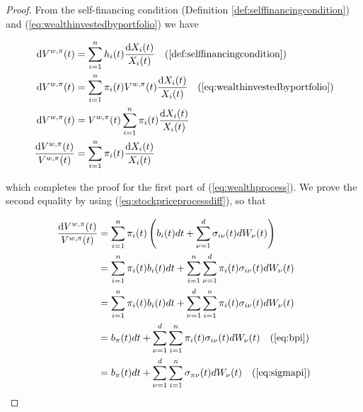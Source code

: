 \documentclass[british]{amsart}
\numberwithin{equation}{section}
\numberwithin{figure}{section}
\theoremstyle{plain}
\theoremstyle{definition}
\theoremstyle{plain}
\theoremstyle{plain}
\theoremstyle{plain}
\theoremstyle{remark}
\theoremstyle{plain}
\renewcommand{\d}[1]{\mathop{\mathrm{d}{#1}}}
\begin{document}
\begin{proof}

	From the self-financing condition (Definition \ref{def:selffinancingcondition}) 
  and (\ref{eq:wealthinvestedbyportfolio}) we have

	\begin{gather*}
		\begin{split}
	\d{V^{w,\pi}(t)} &= \sum_{i=1}^{n} h_{i}(t) \frac{\d{X_{i}(t)}}{X_{i}(t)}
			\quad (\ref{def:selffinancingcondition}) \\
 	\d{V^{w,\pi}(t)} &= \sum_{i=1}^{n} \pi_{i}(t)V^{w,\pi}(t) \frac{\d{X_{i}(t)}}{X_{i}(t)}
			\quad (\ref{eq:wealthinvestedbyportfolio}) \\
 	\d{V^{w,\pi}(t)} &= V^{w,\pi}(t) \sum_{i=1}^{n} \pi_{i}(t) \frac{\d{X_{i}(t)}}{X_{i}(t)} \\
 	\frac{\d{V^{w,\pi}(t)}}{V^{w,\pi}(t)} &= \sum_{i=1}^{n} \pi_{i}(t) \frac{\d{X_{i}(t)}}{X_{i}(t)} \\
		\end{split}
	\end{gather*}

	which completes the proof for the first part of (\ref{eq:wealthprocess}). We
	prove the second equality by using (\ref{eq:stockpriceprocessdiff}), so that

	\begin{gather*}
		\begin{split}
			\frac{\d{V^{w,\pi}(t)}}{V^{w,\pi}(t)}
					& = \sum_{i=1}^{n} \pi_{i}(t) 
					\left(
						b_{i}(t)dt + \sum_{\nu=1}^{d} \sigma_{i\nu}(t) dW_{\nu}(t)
					\right) \\
					& = \sum_{i=1}^{n} \pi_{i}(t) b_{i}(t)dt + 
							\sum_{i=1}^{n} \sum_{\nu=1}^{d} \pi_{i}(t) \sigma_{i\nu}(t) dW_{\nu}(t) \\
					& = \sum_{i=1}^{n} \pi_{i}(t) b_{i}(t)dt + 
							\sum_{\nu=1}^{d} \sum_{i=1}^{n} \pi_{i}(t) \sigma_{i\nu}(t) dW_{\nu}(t) \\
					& = b_{\pi}(t)dt + 
							\sum_{\nu=1}^{d} \sum_{i=1}^{n} \pi_{i}(t) \sigma_{i\nu}(t) dW_{\nu}(t) 
					\quad (\ref{eq:bpi}) \\
					& = b_{\pi}(t)dt + 
							\sum_{\nu=1}^{d} \sum_{i=1}^{n} \sigma_{\pi\nu}(t) dW_{\nu}(t) 
					\quad (\ref{eq:sigmapi}) \\
		\end{split}
	\end{gather*}

\end{proof}
\end{document}
